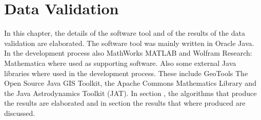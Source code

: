 \chapter{Data Validation}
\label{chap:DataValidation}

In this chapter, the details of the software tool and of the results of the data validation are elaborated. The software tool was mainly written in Oracle Java. In the development process also MathWorks MATLAB and Wolfram Research: Mathematica where used as supporting software. Also some external Java libraries where used in the development process. These include GeoTools The Open Source Java GIS Toolkit, the Apache Commons Mathematics Library and the Java Astrodynamics Toolkit (JAT). In section \pageref{SoftwareToolInternals}, the algorithms that produce the results are elaborated and in section \pageref{sec:ValidationResults} the results that where produced are discussed.
